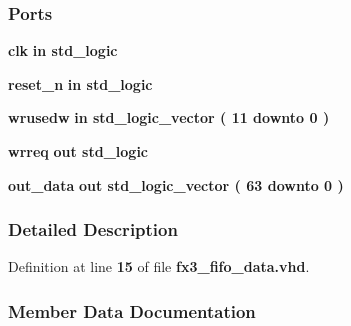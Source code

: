 \subsubsection*{Ports}
 \begin{DoxyCompactItemize}
\item 
{\bf clk}  {\bfseries {\bfseries \textcolor{keywordflow}{in}\textcolor{vhdlchar}{ }}} {\bfseries \textcolor{comment}{std\+\_\+logic}\textcolor{vhdlchar}{ }} 
\item 
{\bf reset\+\_\+n}  {\bfseries {\bfseries \textcolor{keywordflow}{in}\textcolor{vhdlchar}{ }}} {\bfseries \textcolor{comment}{std\+\_\+logic}\textcolor{vhdlchar}{ }} 
\item 
{\bf wrusedw}  {\bfseries {\bfseries \textcolor{keywordflow}{in}\textcolor{vhdlchar}{ }}} {\bfseries \textcolor{comment}{std\+\_\+logic\+\_\+vector}\textcolor{vhdlchar}{ }\textcolor{vhdlchar}{(}\textcolor{vhdlchar}{ }\textcolor{vhdlchar}{ } \textcolor{vhdldigit}{11} \textcolor{vhdlchar}{ }\textcolor{keywordflow}{downto}\textcolor{vhdlchar}{ }\textcolor{vhdlchar}{ } \textcolor{vhdldigit}{0} \textcolor{vhdlchar}{ }\textcolor{vhdlchar}{)}\textcolor{vhdlchar}{ }} 
\item 
{\bf wrreq}  {\bfseries {\bfseries \textcolor{keywordflow}{out}\textcolor{vhdlchar}{ }}} {\bfseries \textcolor{comment}{std\+\_\+logic}\textcolor{vhdlchar}{ }} 
\item 
{\bf out\+\_\+data}  {\bfseries {\bfseries \textcolor{keywordflow}{out}\textcolor{vhdlchar}{ }}} {\bfseries \textcolor{comment}{std\+\_\+logic\+\_\+vector}\textcolor{vhdlchar}{ }\textcolor{vhdlchar}{(}\textcolor{vhdlchar}{ }\textcolor{vhdlchar}{ } \textcolor{vhdldigit}{63} \textcolor{vhdlchar}{ }\textcolor{keywordflow}{downto}\textcolor{vhdlchar}{ }\textcolor{vhdlchar}{ } \textcolor{vhdldigit}{0} \textcolor{vhdlchar}{ }\textcolor{vhdlchar}{)}\textcolor{vhdlchar}{ }} 
\end{DoxyCompactItemize}


\subsubsection{Detailed Description}


Definition at line {\bf 15} of file {\bf fx3\+\_\+fifo\+\_\+data.\+vhd}.



\subsubsection{Member Data Documentation}
